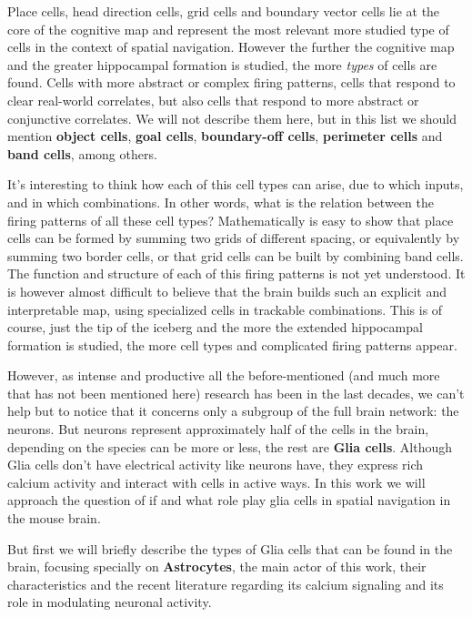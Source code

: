Place cells, head direction cells, grid cells and boundary vector cells lie at the core of the cognitive map and represent the most relevant more studied type of cells in the context of spatial navigation. 
However the further the cognitive map and the greater hippocampal formation is studied, the more \textit{types} of cells are found. 
Cells with more abstract or complex firing patterns, cells that respond to clear real-world correlates, but also cells that respond to more abstract or conjunctive correlates. 
We will not describe them here, but in this list we should mention \textbf{object cells}, \textbf{goal cells}, \textbf{boundary-off cells}, \textbf{perimeter cells} and \textbf{band cells}, among others. 

It's interesting to think how each of this cell types can arise, due to which inputs, and in which combinations.
In other words, what is the relation between the firing patterns of all these cell types?
Mathematically is easy to show that place cells can be formed by summing two grids of different spacing, or equivalently by summing two border cells, or that grid cells can be built by combining band cells.
The function and structure of each of this firing patterns is not yet understood.
It is however almost difficult to believe that the brain builds such an explicit and interpretable map, using specialized cells in trackable combinations.
This is of course, just the tip of the iceberg and the more the extended hippocampal formation is studied, the more cell types and complicated firing patterns appear. 

However, as intense and productive all the before-mentioned (and much more that has not been mentioned here) research has been in the last decades, we can't help but to notice that it concerns only a subgroup of the full brain network: the neurons.
But neurons represent approximately half of the cells in the brain, depending on the species can be more or less, the rest are \textbf{Glia cells}.
Although Glia cells don't have electrical activity like neurons have, they express rich calcium activity and interact with cells in active ways. 
In this work we will approach the question of if and what role play glia cells in spatial navigation in the mouse brain. 

But first we will briefly describe the types of Glia cells that can be found in the brain, focusing specially on \textbf{Astrocytes}, the main actor of this work,  their characteristics and the recent literature regarding its calcium signaling and its role in modulating neuronal activity. 

